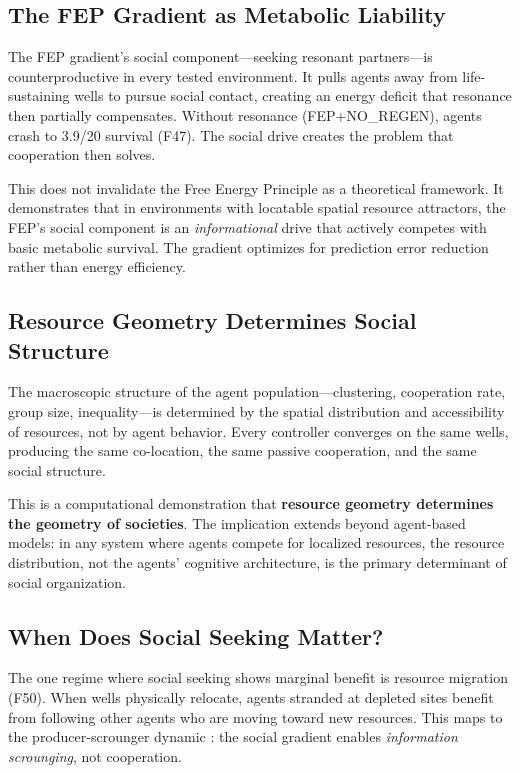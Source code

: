 \documentclass[12pt,a4paper]{article}
\begin{document}
\subsection{The FEP Gradient as Metabolic Liability}

The FEP gradient's social component---seeking resonant partners---is counterproductive in every tested environment. It pulls agents away from life-sustaining wells to pursue social contact, creating an energy deficit that resonance then partially compensates. Without resonance (FEP+NO\_REGEN), agents crash to 3.9/20 survival (F47). The social drive creates the problem that cooperation then solves.

This does not invalidate the Free Energy Principle as a theoretical framework. It demonstrates that in environments with locatable spatial resource attractors, the FEP's social component is an \emph{informational} drive that actively competes with basic metabolic survival. The gradient optimizes for prediction error reduction rather than energy efficiency.

\subsection{Resource Geometry Determines Social Structure}

The macroscopic structure of the agent population---clustering, cooperation rate, group size, inequality---is determined by the spatial distribution and accessibility of resources, not by agent behavior. Every controller converges on the same wells, producing the same co-location, the same passive cooperation, and the same social structure.

This is a computational demonstration that \textbf{resource geometry determines the geometry of societies}. The implication extends beyond agent-based models: in any system where agents compete for localized resources, the resource distribution, not the agents' cognitive architecture, is the primary determinant of social organization.

\subsection{When Does Social Seeking Matter?}

The one regime where social seeking shows marginal benefit is resource migration (F50). When wells physically relocate, agents stranded at depleted sites benefit from following other agents who are moving toward new resources. This maps to the producer-scrounger dynamic \cite{giraldeau2000}: the social gradient enables \emph{information scrounging}, not cooperation.
\end{document}
